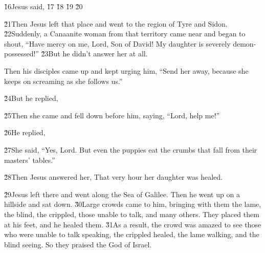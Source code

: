 \v{16}Jesus said,  \v{17} \v{18} \v{19} \v{20}

\v{21}Then Jesus left that place and went to the region of Tyre and Sidon. \v{22}Suddenly, a Canaanite woman from that territory came near and began to shout, ``Have mercy on me, Lord, Son of David! My daughter is severely demon-possessed!'' \v{23}But he didn't answer her at all.

Then his disciples came up and kept urging him, ``Send her away, because she keeps on screaming as she follows us.''

\v{24}But he replied, 

\v{25}Then she came and fell down before him, saying, ``Lord, help me!''

\v{26}He replied, 

\v{27}She said, ``Yes, Lord. But even the puppies eat the crumbs that fall from their masters' tables.''

\v{28}Then Jesus answered her,  That very hour her daughter was healed.

\v{29}Jesus left there and went along the Sea of Galilee. Then he went up on a hillside and sat down. \v{30}Large crowds came to him, bringing with them the lame, the blind, the crippled, those unable to talk, and many others. They placed them at his feet, and he healed them. \v{31}As a result, the crowd was amazed to see those who were unable to talk speaking, the crippled healed, the lame walking, and the blind seeing. So they praised the God of Israel.

